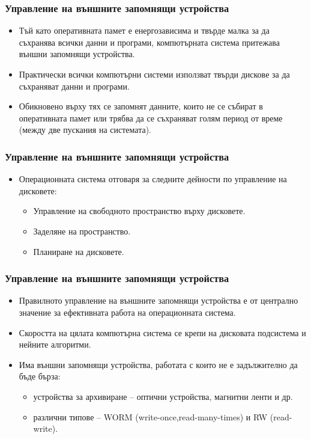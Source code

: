 \documentclass[ignorenonframetext, hyperref=unicode]{beamer}
\begin{document}
\begin{frame}
\frametitle{Управление на външните запомнящи устройства}
\begin{itemize}
\item Тъй като оперативната памет е енергозависима и твърде малка за да
съхранява всички данни и програми, компютърната система притежава външни
запомнящи устройства.
\item Практически всички компютърни системи използват твърди дискове за да
съхраняват данни и програми.
\item Обикновено върху тях се запомнят данните, които не се събират в
оперативната памет или трябва да се съхраняват голям период от време (между две
пускания на системата).
\end{itemize}
\end{frame}

\begin{frame}
\frametitle{Управление на външните запомнящи устройства}
\begin{itemize}
\item Операционната система отговаря за следните дейности по управление на
дисковете:
\begin{itemize}
  \item Управление на свободното пространство върху дисковете.
  \item Заделяне на пространство.
  \item Планиране на дисковете.
\end{itemize}
\end{itemize}
\end{frame}
         

\begin{frame}
\frametitle{Управление на външните запомнящи устройства}
\begin{itemize}
\item Правилното управление на външните запомнящи устройства е от централно
значение за ефективната работа на операционната система.
\item Скоростта на цялата компютърна система се крепи на дисковата подсистема и
нейните алгоритми.
\item Има външни запомнящи устройства, работата с които не е задължително да
бъде бърза:
\begin{itemize}
  \item устройства за архивиране -- оптични устройства, магнитни ленти и др.
  \item различни типове -- WORM (write-once,read-many-times) и RW (read-write).
\end{itemize}
\end{itemize}
\end{frame}
         
\end{document}
